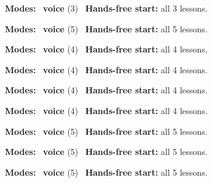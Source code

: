 \expandafter\def\csname hlchaptermodality276\endcsname{%
  {\small\noindent
    \textbf{Modes:} \hlvoicesign{}~\textbf{voice} (3)\quad
    \hlvoicesign{}~\textbf{Hands-free start:} all 3 lessons.%
    \par}\medskip
}

\expandafter\def\csname hlchaptermodality277\endcsname{%
  {\small\noindent
    \textbf{Modes:} \hlvoicesign{}~\textbf{voice} (5)\quad
    \hlvoicesign{}~\textbf{Hands-free start:} all 5 lessons.%
    \par}\medskip
}

\expandafter\def\csname hlchaptermodality278\endcsname{%
  {\small\noindent
    \textbf{Modes:} \hlvoicesign{}~\textbf{voice} (4)\quad
    \hlvoicesign{}~\textbf{Hands-free start:} all 4 lessons.%
    \par}\medskip
}

\expandafter\def\csname hlchaptermodality279\endcsname{%
  {\small\noindent
    \textbf{Modes:} \hlvoicesign{}~\textbf{voice} (4)\quad
    \hlvoicesign{}~\textbf{Hands-free start:} all 4 lessons.%
    \par}\medskip
}

\expandafter\def\csname hlchaptermodality280\endcsname{%
  {\small\noindent
    \textbf{Modes:} \hlvoicesign{}~\textbf{voice} (4)\quad
    \hlvoicesign{}~\textbf{Hands-free start:} all 4 lessons.%
    \par}\medskip
}

\expandafter\def\csname hlchaptermodality281\endcsname{%
  {\small\noindent
    \textbf{Modes:} \hlvoicesign{}~\textbf{voice} (4)\quad
    \hlvoicesign{}~\textbf{Hands-free start:} all 4 lessons.%
    \par}\medskip
}

\expandafter\def\csname hlchaptermodality282\endcsname{%
  {\small\noindent
    \textbf{Modes:} \hlvoicesign{}~\textbf{voice} (5)\quad
    \hlvoicesign{}~\textbf{Hands-free start:} all 5 lessons.%
    \par}\medskip
}

\expandafter\def\csname hlchaptermodality283\endcsname{%
  {\small\noindent
    \textbf{Modes:} \hlvoicesign{}~\textbf{voice} (5)\quad
    \hlvoicesign{}~\textbf{Hands-free start:} all 5 lessons.%
    \par}\medskip
}

\expandafter\def\csname hlchaptermodality284\endcsname{%
  {\small\noindent
    \textbf{Modes:} \hlvoicesign{}~\textbf{voice} (5)\quad
    \hlvoicesign{}~\textbf{Hands-free start:} all 5 lessons.%
    \par}\medskip
}

